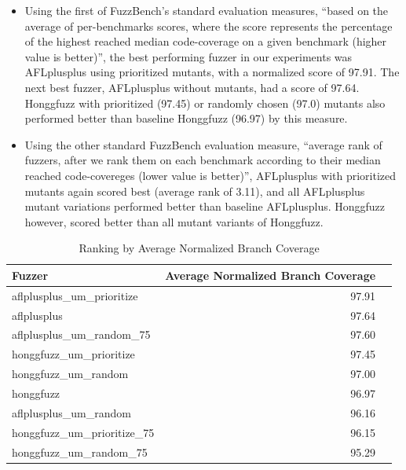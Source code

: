   \begin{itemize}
  \item Using the first of FuzzBench's standard evaluation measures, ``based on the average of per-benchmarks scores, where the score represents the percentage of the highest reached median code-coverage on a given benchmark (higher value is better)'', the best performing fuzzer in our experiments was AFLplusplus using prioritized mutants, with a normalized score of 97.91.  The next best fuzzer, AFLplusplus without mutants, had a score of 97.64.  Honggfuzz with prioritized (97.45) or randomly chosen (97.0) mutants also performed better than baseline Honggfuzz (96.97) by this measure.
    \item Using the other standard FuzzBench evaluation measure, ``average rank of fuzzers, after we rank them on each benchmark according to their median reached code-covereges (lower value is better)'', AFLplusplus with prioritized mutants again scored best (average rank of 3.11), and all AFLplusplus mutant variations performed better than baseline AFLplusplus.  Honggfuzz however, scored better than all mutant variants of Honggfuzz.
    \end{itemize}

    \begin{table}
      \begin{tabular}{l|r|r}
        Fuzzer & Average Normalized Branch Coverage \\
        \hline
        \hline
aflplusplus\_um\_prioritize & 97.91 \\
aflplusplus & 97.64 \\
aflplusplus\_um\_random\_75 & 97.60 \\
honggfuzz\_um\_prioritize & 97.45 \\ 
honggfuzz\_um\_random & 97.00 \\
honggfuzz & 96.97 \\
aflplusplus\_um\_random & 96.16 \\
honggfuzz\_um\_prioritize\_75 & 96.15 \\
honggfuzz\_um\_random\_75 & 95.29 \\
      \end{tabular}
      \caption{Ranking by Average Normalized Branch Coverage}
      \label{tab:rankings1}
    \end{table}

